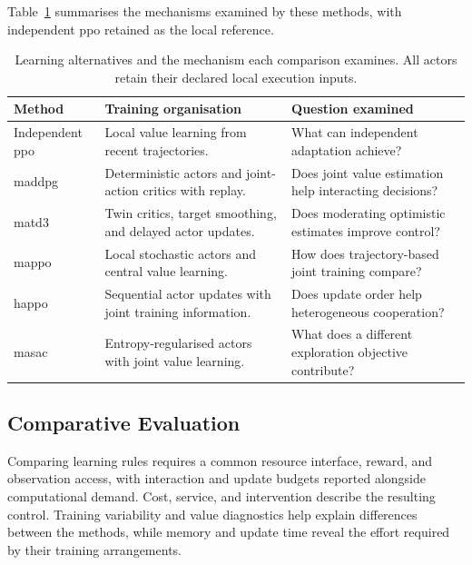 Table~\ref{tab:control-marl-comparators} summarises the mechanisms examined by these methods, with independent \gls{ppo} retained as the local reference.

\begin{table}[htbp]
\centering
\caption{Learning alternatives and the mechanism each comparison examines. All actors retain their declared local execution inputs.}
\label{tab:control-marl-comparators}
\small
\begin{tabularx}{\textwidth}{@{}p{}XX@{}}
\toprule
\textbf{Method} & \textbf{Training organisation} & \textbf{Question examined}\\
\midrule
Independent \gls{ppo} & Local value learning from recent trajectories. & What can independent adaptation achieve?\\
\addlinespace
\gls{maddpg} & Deterministic actors and joint-action critics with replay. & Does joint value estimation help interacting decisions?\\
\addlinespace
\gls{matd3} & Twin critics, target smoothing, and delayed actor updates. & Does moderating optimistic estimates improve control?\\
\addlinespace
\gls{mappo} & Local stochastic actors and central value learning. & How does trajectory-based joint training compare?\\
\addlinespace
\gls{happo} & Sequential actor updates with joint training information. & Does update order help heterogeneous cooperation?\\
\addlinespace
\gls{masac} & Entropy-regularised actors with joint value learning. & What does a different exploration objective contribute?\\
\bottomrule
\end{tabularx}
\end{table}

\subsection{Comparative Evaluation}
\label{sec:control-marl-evaluation}

Comparing learning rules requires a common resource interface, reward, and observation access, with interaction and update budgets reported alongside computational demand. Cost, service, and intervention describe the resulting control. Training variability and value diagnostics help explain differences between the methods, while memory and update time reveal the effort required by their training arrangements.

